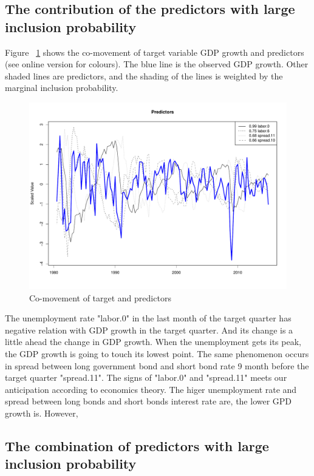 \subsection{The contribution of the predictors with large inclusion probability}

Figure ~\ref{fig:BSTSpredictors} shows the co-movement of target variable GDP growth and predictors (see online version for colours). The blue line is the observed GDP growth. Other shaded lines are predictors, and the shading of the lines is weighted by the marginal inclusion probability.

\begin{figure}[h]
	\centering
	\includegraphics[width=0.9\linewidth]{Figures/BSTSpredictors}
	\caption{Co-movement of target and predictors}
	\label{fig:BSTSpredictors}
\end{figure}

The unemployment rate "labor.0" in the last month of the target quarter has negative relation with GDP growth in the target quarter. And its change is a little ahead the change in GDP growth. When the unemployment gets its peak, the GDP growth is going to touch its lowest point. The same phenomenon occurs in spread between long government bond and short bond rate 9 month before the target quarter "spread.11". The signs of "labor.0" and "spread.11" meets our anticipation according to economics theory. The higer unemployment rate and spread between long bonds and short bonds interest rate are, the lower GPD growth is.  
However, 

\subsection{The combination of predictors with large inclusion probability}









